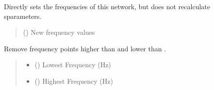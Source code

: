 \documentclass[letterpaper,10pt,english]{sphinxmanual}
\begin{document}
\begin{fulllineitems}

\begin{fulllineitems}
\label{\detokenize{touchstone:touchstone.spfile.set_frequencies_wo_recalc}}
\pysigstartsignatures
{}
\pysigstopsignatures
\sphinxAtStartPar
Directly sets the frequencies of this network, but does not re\sphinxhyphen{}calculate s\sphinxhyphen{}parameters.
\begin{quote}\begin{description}
\sphinxAtStartPar
{} () \textendash{} New frequency values

\end{description}\end{quote}

\end{fulllineitems}


\begin{fulllineitems}
\label{\detokenize{touchstone:touchstone.spfile.set_frequency_limits}}
\pysigstartsignatures
{}
\pysigstopsignatures
\sphinxAtStartPar
Remove frequency points higher than  and lower than .
\begin{quote}\begin{description}
\begin{itemize}
\item {}
\sphinxAtStartPar
{} () \textendash{} Lowest Frequency (Hz)

\item {}
\sphinxAtStartPar
{} () \textendash{} Highest Frequency (Hz)


\end{itemize}
\end{description}
\end{quote}
\end{fulllineitems}
\end{fulllineitems}
\end{document}
